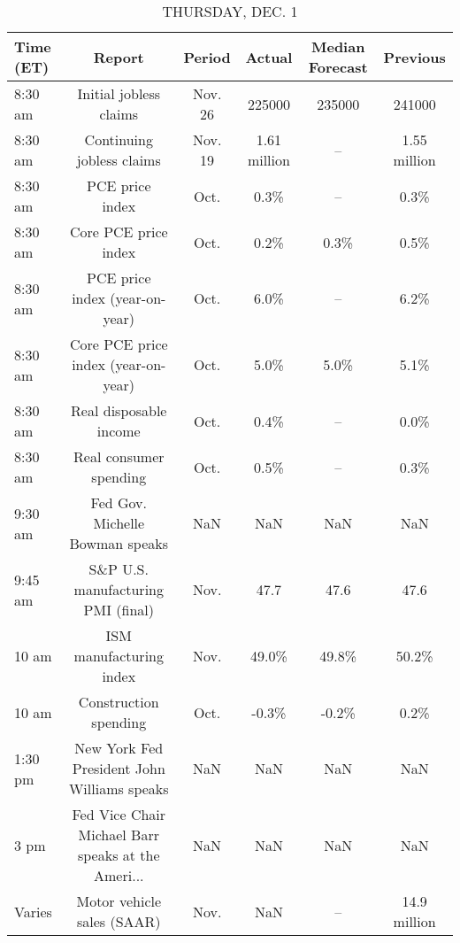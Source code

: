 \documentclass{article}%
\begin{document}
%


\begin{table}[htbp]%
\caption{THURSDAY, DEC. 1}%
\centering%
\begin{adjustbox}{width=1\textwidth}%
\begin{tabular}{lccccc}
\toprule
Time (ET) &                                             Report &  Period &       Actual & Median Forecast &     Previous \\
\midrule
  8:30 am &                             Initial jobless claims & Nov. 26 &       225000 &          235000 &       241000 \\
  8:30 am &                          Continuing jobless claims & Nov. 19 & 1.61 million &              -- & 1.55 million \\
  8:30 am &                                    PCE price index &    Oct. &         0.3\% &              -- &         0.3\% \\
  8:30 am &                               Core PCE price index &    Oct. &         0.2\% &            0.3\% &         0.5\% \\
  8:30 am &                     PCE price index (year-on-year) &    Oct. &         6.0\% &              -- &         6.2\% \\
  8:30 am &                Core PCE price index (year-on-year) &    Oct. &         5.0\% &            5.0\% &         5.1\% \\
  8:30 am &                             Real disposable income &    Oct. &         0.4\% &              -- &         0.0\% \\
  8:30 am &                             Real consumer spending &    Oct. &         0.5\% &              -- &         0.3\% \\
  9:30 am &                    Fed Gov. Michelle Bowman speaks &     NaN &          NaN &             NaN &          NaN \\
  9:45 am &                 S\&P U.S. manufacturing PMI (final) &    Nov. &         47.7 &            47.6 &         47.6 \\
    10 am &                            ISM manufacturing index &    Nov. &        49.0\% &           49.8\% &        50.2\% \\
    10 am &                              Construction spending &    Oct. &        -0.3\% &           -0.2\% &         0.2\% \\
  1:30 pm &        New York Fed President John Williams speaks &     NaN &          NaN &             NaN &          NaN \\
     3 pm & Fed Vice Chair Michael Barr speaks at the Ameri... &     NaN &          NaN &             NaN &          NaN \\
   Varies &                         Motor vehicle sales (SAAR) &    Nov. &          NaN &              -- & 14.9 million \\
\bottomrule
\end{tabular}
%
\end{adjustbox}%
\end{table}
\end{document}
